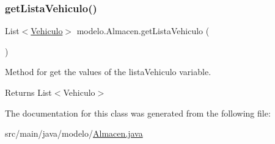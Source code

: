 \subsubsection{\texorpdfstring{get\+Lista\+Vehiculo()}{getListaVehiculo()}}
{\footnotesize\ttfamily List$<$\mbox{\hyperlink{classmodelo_1_1_vehiculo}{Vehiculo}}$>$ modelo.\+Almacen.\+get\+Lista\+Vehiculo (\begin{DoxyParamCaption}{ }\end{DoxyParamCaption})}



Method for get the values of the lista\+Vehiculo variable. 

\begin{DoxyReturn}{Returns}
List$<$\+Vehiculo$>$ 
\end{DoxyReturn}


The documentation for this class was generated from the following file\+:\begin{DoxyCompactItemize}
\item 
src/main/java/modelo/\mbox{\hyperlink{_almacen_8java}{Almacen.\+java}}\end{DoxyCompactItemize}
